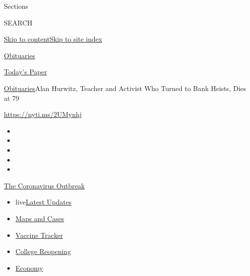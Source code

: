 Sections

SEARCH

\protect\hyperlink{site-content}{Skip to
content}\protect\hyperlink{site-index}{Skip to site index}

\href{https://www.nytimes.com/section/obituaries}{Obituaries}

\href{https://myaccount.nytimes.com/auth/login?response_type=cookie\&client_id=vi}{}

\href{https://www.nytimes.com/section/todayspaper}{Today's Paper}

\href{/section/obituaries}{Obituaries}\textbar{}Alan Hurwitz, Teacher
and Activist Who Turned to Bank Heists, Dies at 79

\url{https://nyti.ms/2UMynhj}

\begin{itemize}
\item
\item
\item
\item
\item
\end{itemize}

\href{https://www.nytimes.com/news-event/coronavirus?action=click\&pgtype=Article\&state=default\&region=TOP_BANNER\&context=storylines_menu}{The
Coronavirus Outbreak}

\begin{itemize}
\tightlist
\item
  live\href{https://www.nytimes.com/2020/08/03/world/coronavirus-covid-19.html?action=click\&pgtype=Article\&state=default\&region=TOP_BANNER\&context=storylines_menu}{Latest
  Updates}
\item
  \href{https://www.nytimes.com/interactive/2020/us/coronavirus-us-cases.html?action=click\&pgtype=Article\&state=default\&region=TOP_BANNER\&context=storylines_menu}{Maps
  and Cases}
\item
  \href{https://www.nytimes.com/interactive/2020/science/coronavirus-vaccine-tracker.html?action=click\&pgtype=Article\&state=default\&region=TOP_BANNER\&context=storylines_menu}{Vaccine
  Tracker}
\item
  \href{https://www.nytimes.com/2020/08/02/us/covid-college-reopening.html?action=click\&pgtype=Article\&state=default\&region=TOP_BANNER\&context=storylines_menu}{College
  Reopening}
\item
  \href{https://www.nytimes.com/live/2020/08/03/business/stock-market-today-coronavirus?action=click\&pgtype=Article\&state=default\&region=TOP_BANNER\&context=storylines_menu}{Economy}
\end{itemize}

